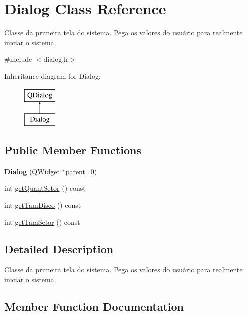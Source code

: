 \hypertarget{classDialog}{}\section{Dialog Class Reference}
\label{classDialog}


Classe da primeira tela do sistema. Pega os valores do usuário para realmente iniciar o sistema.  




{\ttfamily \#include $<$dialog.\+h$>$}

Inheritance diagram for Dialog\+:\begin{figure}[H]
\begin{center}
\leavevmode
\includegraphics[height=2.000000cm]{classDialog}
\end{center}
\end{figure}
\subsection*{Public Member Functions}
\begin{DoxyCompactItemize}
\item 
\hypertarget{classDialog_acfa2063f9f962d394c6a645b6e7e08d8}{}{\bfseries Dialog} (Q\+Widget $\ast$parent=0)\label{classDialog_acfa2063f9f962d394c6a645b6e7e08d8}

\item 
int \hyperlink{classDialog_a6b0119c5bf8caa17599f5886dbbfc785}{get\+Quant\+Setor} () const 
\item 
int \hyperlink{classDialog_ac632d4306f67630cc30a1706323819bb}{get\+Tam\+Disco} () const 
\item 
int \hyperlink{classDialog_a7b5648b3e00170bd86f875de20f17eda}{get\+Tam\+Setor} () const 
\end{DoxyCompactItemize}


\subsection{Detailed Description}
Classe da primeira tela do sistema. Pega os valores do usuário para realmente iniciar o sistema. 

\subsection{Member Function Documentation}
\hypertarget{classDialog_a6b0119c5bf8caa17599f5886dbbfc785}{}
